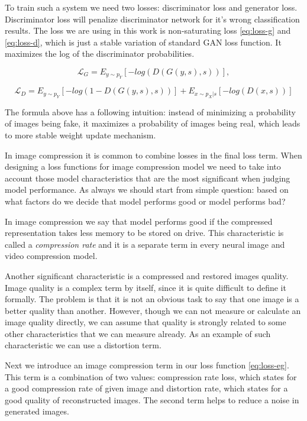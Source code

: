 To train such a system we need two losses: discriminator loss and generator loss. Discriminator loss will penalize discriminator network for it's wrong classification results. The loss we are using in this work is non-saturating loss \ref{eq:loss-g} and \ref{eq:loss-d}, which is just a stable variation of standard GAN loss function. It maximizes the log of the discriminator probabilities.

\begin{equation}
    \label{eq:loss-g}
    \mathcal{L}_G=E_{y\sim p_Y}[-log(D(G(y,s),s))],
\end{equation}

\begin{equation}
    \label{eq:loss-d}
    \mathcal{L}_D=E_{y\sim p_Y}[-log(1-D(G(y,s),s))]+E_{x\sim p_X|s}[-log(D(x,s))]
\end{equation}

The formula above has a following intuition: instead of minimizing a probability of images being fake, it maximizes a probability of images being real, which leads to more stable weight update mechanism.

In image compression it is common to combine losses in the final loss term. When designing a loss functions for image compression model we need to take into account those model characteristics that are the most significant when judging model performance. As always we should start from simple question: based on what factors do we decide that model performs good or model performs bad?

In image compression we say that model performs good if the compressed representation takes less memory to be stored on drive. This characteristic is called a \textit{compression rate} and it is a separate term in every neural image and video compression model.

Another significant characteristic is a compressed and restored images quality. Image quality is a complex term by itself, since it is quite difficult to define it formally. The problem is that it is not an obvious task to say that one image is a better quality than another. However, though we can not measure or calculate an image quality directly, we can assume that quality is strongly related to some other characteristics that we can measure already. As an example of such characteristic we can use a distortion term.

Next we introduce an image compression term in our loss function \ref{eq:loss-eg}. This term is a combination of two values: compression rate loss, which states for a good compression rate of given image and distortion rate, which states for a good quality of reconstructed images. The second term helps to reduce a noise in generated images.


